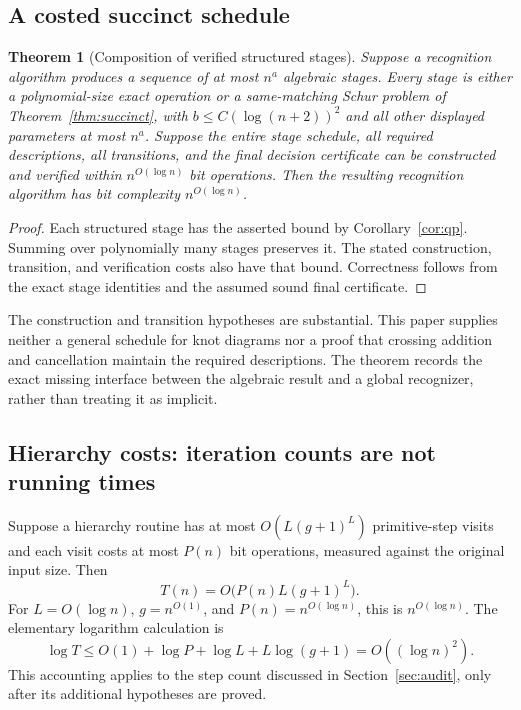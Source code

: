 \documentclass[11pt]{article}
\newtheorem{theorem}{Theorem}[section]
\theoremstyle{definition}\newtheorem{definition}[theorem]{Definition}
\theoremstyle{remark}\newtheorem{remark}[theorem]{Remark}
\begin{document}
\subsection{A costed succinct schedule}
\begin{theorem}[Composition of verified structured stages]\label{thm:schedule}
Suppose a recognition algorithm produces a sequence of at most $n^a$ algebraic stages. Every stage is either a polynomial-size exact operation or a same-matching Schur problem of Theorem~\ref{thm:succinct}, with $b\leq C(\log(n+2))^2$ and all other displayed parameters at most $n^a$. Suppose the entire stage schedule, all required descriptions, all transitions, and the final decision certificate can be constructed and verified within $n^{O(\log n)}$ bit operations. Then the resulting recognition algorithm has bit complexity $n^{O(\log n)}$.
\end{theorem}
\begin{proof}
Each structured stage has the asserted bound by Corollary~\ref{cor:qp}. Summing over polynomially many stages preserves it. The stated construction, transition, and verification costs also have that bound. Correctness follows from the exact stage identities and the assumed sound final certificate.
\end{proof}
The construction and transition hypotheses are substantial. This paper supplies neither a general schedule for knot diagrams nor a proof that crossing addition and cancellation maintain the required descriptions. The theorem records the exact missing interface between the algebraic result and a global recognizer, rather than treating it as implicit.

\subsection{Hierarchy costs: iteration counts are not running times}
Suppose a hierarchy routine has at most $O(L(g+1)^L)$ primitive-step visits and each visit costs at most $P(n)$ bit operations, measured against the original input size. Then
\begin{equation}\label{eq:hierarchy}
 T(n)=O\bigl(P(n)L(g+1)^L\bigr).
\end{equation}
For $L=O(\log n)$, $g=n^{O(1)}$, and $P(n)=n^{O(\log n)}$, this is $n^{O(\log n)}$. The elementary logarithm calculation is
\[
 \log T\leq O(1)+\log P+\log L+L\log(g+1)=O((\log n)^2).
\]
This accounting applies to the step count discussed in Section~\ref{sec:audit}, only after its additional hypotheses are proved.
\end{document}

